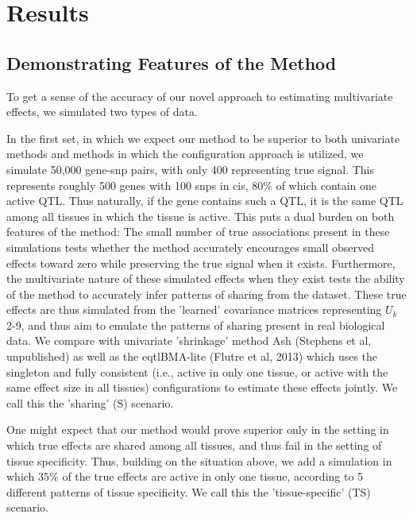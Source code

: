 \section{Results}
\subsection{Demonstrating Features of the Method}

To get a sense of the accuracy of our novel approach to estimating multivariate effects, we simulated two types of data. 

In the first set, in which we expect our method to be superior to both univariate methods and methods in which the configuration approach is utilized, we simulate 50,000 gene-snp pairs, with only 400 representing true signal. This represents roughly 500 genes with 100 snps in cis, $80\%$ of which contain one active QTL. Thus naturally, if the gene contains such a QTL, it is the same QTL among all tissues in which the tissue is active. This puts a dual burden on both features of the method: The small number of true associations present in these simulations tests whether the method accurately encourages small observed effects toward zero while preserving the true signal when it exists. Furthermore, the  multivariate nature of these simulated effects when they exist tests the ability of the method to accurately infer patterns of sharing from the dataset. These true effects are thus simulated from the 'learned' covariance matrices representing $U_{k}$ 2-9, and thus aim to emulate the patterns of sharing present in real biological data. We compare with univariate 'shrinkage' method Ash (Stephens et al, unpublished) as well as the eqtlBMA-lite (Flutre et al, 2013) which uses the singleton and fully consistent (i.e., active in only one tissue, or active with the same effect size in all tissues) configurations to estimate these effects jointly. We call this the 'sharing' (S) scenario. 

One might expect that our method would prove superior only in the setting in which true effects are shared among all tissues, and thus fail in the setting of tissue specificity. Thus, building on the situation above, we add a simulation in which $35\%$ of the true effects are active in only one tissue, according to 5 different patterns of tissue specificity. We call this the 'tissue-specific' (TS) scenario. 

